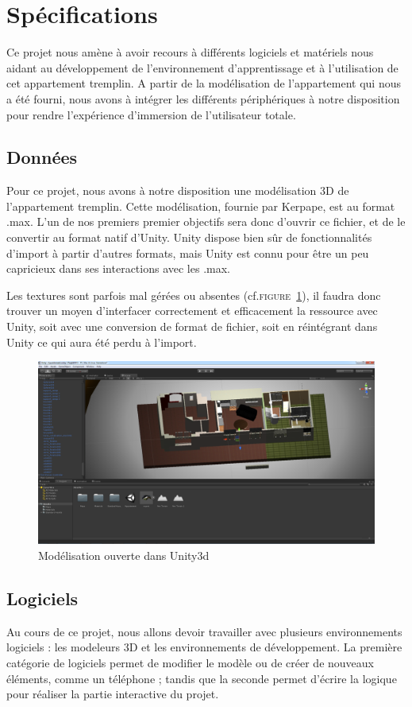 \section{Spécifications}
	Ce projet nous amène à avoir recours à différents logiciels et matériels nous aidant au développement de l'environnement d'apprentissage et à l'utilisation de cet appartement tremplin. A partir de la modélisation de l'appartement qui nous a été fourni, nous avons à intégrer les différents périphériques à notre disposition pour rendre l'expérience d'immersion de l'utilisateur totale.

\subsection{Données}
	Pour ce projet, nous avons à notre disposition une modélisation 3D de l'appartement tremplin. Cette modélisation, fournie par Kerpape, est au format .max. L'un de nos premiers premier objectifs sera donc d'ouvrir ce fichier, et de le convertir au format natif d'Unity. Unity dispose bien sûr de fonctionnalités d'import à partir d'autres formats, mais Unity est connu pour être un peu capricieux dans ses interactions avec les .max.

	Les textures sont parfois mal gérées ou absentes (cf.\textsc{figure~\ref{unity}}), il faudra donc trouver un moyen d'interfacer correctement et efficacement la ressource avec Unity, soit avec une conversion de format de fichier, soit en réintégrant dans Unity ce qui aura été perdu à l'import.
	\begin{figure}[h]
		\centering
		\includegraphics[width=\textwidth]{1-PreEtude/img/appart_unity}
		\caption{Modélisation ouverte dans Unity3d}
		\label{unity}
	\end{figure}

\subsection{Logiciels}
	Au cours de ce projet, nous allons devoir travailler avec plusieurs environnements logiciels : les modeleurs 3D et les environnements de développement. La première catégorie de logiciels permet de modifier le modèle ou de créer de nouveaux éléments, comme un téléphone ; tandis que la seconde permet d'écrire la logique pour réaliser la partie interactive du projet.

